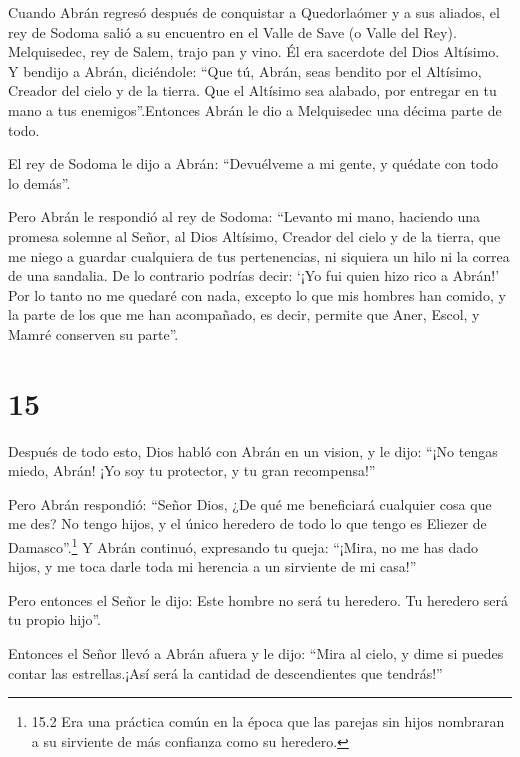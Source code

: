  Cuando Abrán regresó después de conquistar a Quedorlaómer
y a sus aliados, el rey de Sodoma salió a su encuentro en el Valle de
Save (o Valle del Rey).  Melquisedec, rey de Salem, trajo
pan y vino. Él era sacerdote del Dios Altísimo.  Y bendijo
a Abrán, diciéndole: ``Que tú, Abrán, seas bendito por el Altísimo,
Creador del cielo y de la tierra.  Que el Altísimo sea
alabado, por entregar en tu mano a tus enemigos''.Entonces Abrán le dio
a Melquisedec una décima parte de todo.

 El rey de Sodoma le dijo a Abrán: ``Devuélveme a mi gente,
y quédate con todo lo demás''.

 Pero Abrán le respondió al rey de Sodoma: ``Levanto mi
mano, haciendo una promesa solemne al Señor, al Dios Altísimo, Creador
del cielo y de la tierra,  que me niego a guardar
cualquiera de tus pertenencias, ni siquiera un hilo ni la correa de una
sandalia. De lo contrario podrías decir: `¡Yo fui quien hizo rico a
Abrán!'  Por lo tanto no me quedaré con nada, excepto lo
que mis hombres han comido, y la parte de los que me han acompañado, es
decir, permite que Aner, Escol, y Mamré conserven su parte''.

\hypertarget{section-14}{%
\section{15}\label{section-14}}

 Después de todo esto, Dios habló con Abrán en un vision, y
le dijo: ``¡No tengas miedo, Abrán! ¡Yo soy tu protector, y tu gran
recompensa!''

 Pero Abrán respondió: ``Señor Dios, ¿De qué me beneficiará
cualquier cosa que me des? No tengo hijos, y el único heredero de todo
lo que tengo es Eliezer de Damasco''.\footnote{15.2 Era una práctica
  común en la época que las parejas sin hijos nombraran a su sirviente
  de más confianza como su heredero.}  Y Abrán continuó,
expresando tu queja: ``¡Mira, no me has dado hijos, y me toca darle toda
mi herencia a un sirviente de mi casa!''

 Pero entonces el Señor le dijo: Este hombre no será tu
heredero. Tu heredero será tu propio hijo''.

 Entonces el Señor llevó a Abrán afuera y le dijo: ``Mira al
cielo, y dime si puedes contar las estrellas.¡Así será la cantidad de
descendientes que tendrás!''

